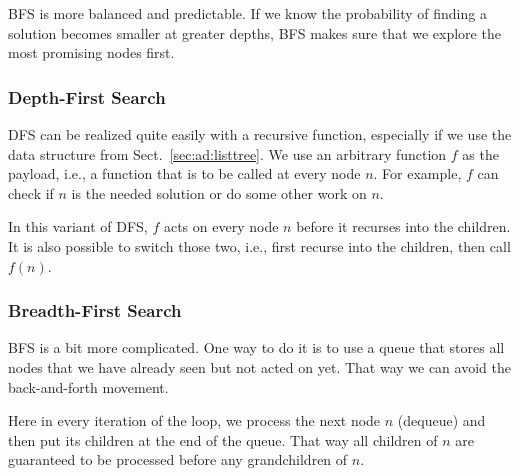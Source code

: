 BFS is more balanced and predictable.
If we know the probability of finding a solution becomes smaller at greater depths, BFS makes sure that we explore the most promising nodes first.

\subsubsection{Depth-First Search}

DFS can be realized quite easily with a recursive function, especially if we use the data structure from Sect.~\ref{sec:ad:listtree}.
We use an arbitrary function $f$ as the payload, i.e., a function that is to be called at every node $n$.
For example, $f$ can check if $n$ is the needed solution or do some other work on $n$.

\begin{acode}
\end{acode}

In this variant of DFS, $f$ acts on every node $n$ before it recurses into the children.
It is also possible to switch those two, i.e., first recurse into the children, then call $f(n)$.

\subsubsection{Breadth-First Search}

BFS is a bit more complicated.
One way to do it is to use a queue that stores all nodes that we have already seen but not acted on yet.
That way we can avoid the back-and-forth movement.

\begin{acode}
\end{acode}

Here in every iteration of the loop, we process the next node $n$ (dequeue) and then put its children at the end of the queue.
That way all children of $n$ are guaranteed to be processed before any grandchildren of $n$.
\medskip

